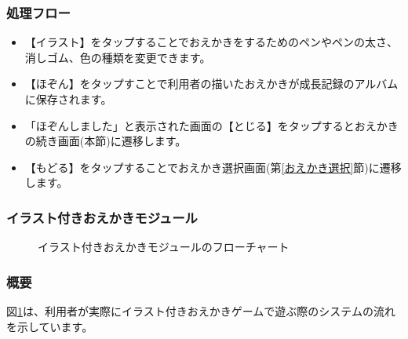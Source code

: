 \documentclass[a4j]{jarticle}
\begin{document}
\subsubsection*{処理フロー}
\begin{itemize}
\item【イラスト】をタップすることでおえかきをするためのペンやペンの太さ、消しゴム、色の種類を変更できます。
\item【ほぞん】をタップすことで利用者の描いたおえかきが成長記録のアルバムに保存されます。
\item「ほぞんしました」と表示された画面の【とじる】をタップするとおえかきの続き画面(本節)に遷移します。　
\item【もどる】をタップすることでおえかき選択画面(第\ref{おえかき選択}節)に遷移します。
\end{itemize}

\newpage
\subsubsection{イラスト付きおえかきモジュール\label{イラスト}}
\begin{figure}[H]
    \begin{center}
    \caption {イラスト付きおえかきモジュールのフローチャート}
    \label{illustration}
    \end{center}
\end{figure}

\subsubsection*{概要}
図\ref{illustration}は、利用者が実際にイラスト付きおえかきゲームで遊ぶ際のシステムの流れを示しています。
\end{document}
